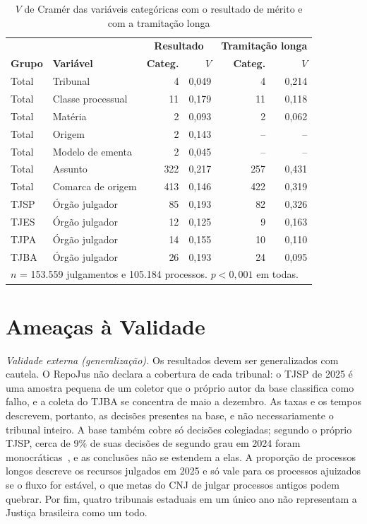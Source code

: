 \documentclass[conference]{IEEEtran}
\begin{document}
\begin{table}[!t]
\caption{$V$ de Cramér das variáveis categóricas com o resultado de mérito e com a tramitação longa}
\label{tab:associacao}
\centering
\footnotesize
\setlength{\tabcolsep}{3pt}
\begin{tabular}{llrrrr}
\hline
 & & \multicolumn{2}{c}{\textbf{Resultado}} & \multicolumn{2}{c}{\textbf{Tramitação longa}} \\
\textbf{Grupo} & \textbf{Variável} & \textbf{Categ.} & \textbf{$V$} & \textbf{Categ.} & \textbf{$V$} \\
\hline
Total & Tribunal          & 4   & 0,049 & 4   & 0,214 \\
Total & Classe processual & 11  & 0,179 & 11  & 0,118 \\
Total & Matéria           & 2   & 0,093 & 2   & 0,062 \\
Total & Origem            & 2   & 0,143 & --  & --    \\
Total & Modelo de ementa  & 2   & 0,045 & --  & --    \\
Total & Assunto           & 322 & 0,217 & 257 & 0,431 \\
Total & Comarca de origem & 413 & 0,146 & 422 & 0,319 \\
TJSP  & Órgão julgador    & 85  & 0,193 & 82  & 0,326 \\
TJES  & Órgão julgador    & 12  & 0,125 & 9   & 0,163 \\
TJPA  & Órgão julgador    & 14  & 0,155 & 10  & 0,110 \\
TJBA  & Órgão julgador    & 26  & 0,193 & 24  & 0,095 \\
\hline
\multicolumn{6}{l}{\footnotesize $n$ = 153.559 julgamentos e 105.184 processos. $p < 0{,}001$ em todas.}
\end{tabular}
\end{table}

\section{Ameaças à Validade}\label{sec:ameacas}

\emph{Validade externa (generalização).} Os resultados devem ser generalizados
com cautela. O RepoJus não declara a cobertura de cada tribunal: o TJSP de 2025
é uma amostra pequena de um coletor que o próprio autor da base classifica como
falho, e a coleta do TJBA se concentra de maio a dezembro. As taxas e os tempos
descrevem, portanto, as decisões presentes na base, e não necessariamente o
tribunal inteiro. A base também cobre só decisões colegiadas; segundo o próprio
TJSP, cerca de 9\% de suas decisões de segundo grau em 2024 foram
monocráticas~\cite{tjsp2024}, e as conclusões não se estendem a elas. A
proporção de processos longos descreve os recursos julgados em 2025 e só vale
para os processos ajuizados se o fluxo for estável, o que metas do CNJ de
julgar processos antigos podem quebrar. Por fim, quatro tribunais
estaduais em um único ano não representam a Justiça brasileira como um todo.
\end{document}
